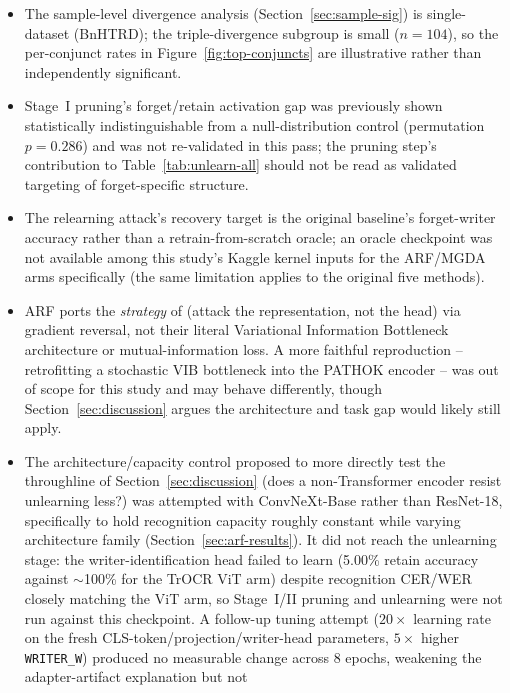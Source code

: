 \documentclass[a4paper,fleqn]{cas-dc}
\begin{document}
\begin{itemize}
\item The sample-level divergence analysis (Section~\ref{sec:sample-sig})
  is single-dataset (BnHTRD); the triple-divergence subgroup is small
  ($n=104$), so the per-conjunct rates in Figure~\ref{fig:top-conjuncts}
  are illustrative rather than independently significant.
\item Stage~I pruning's forget/retain activation gap was previously shown
  statistically indistinguishable from a null-distribution control
  (permutation $p=0.286$) and was not re-validated in this pass; the
  pruning step's contribution to Table~\ref{tab:unlearn-all} should not be
  read as validated targeting of forget-specific structure.
\item The relearning attack's recovery target is the original baseline's
  forget-writer accuracy rather than a retrain-from-scratch oracle; an
  oracle checkpoint was not available among this study's Kaggle kernel
  inputs for the ARF/MGDA arms specifically (the same limitation applies
  to the original five methods).
\item ARF ports the \emph{strategy} of \citet{wang2026rfuss} (attack the
  representation, not the head) via gradient reversal, not their literal
  Variational Information Bottleneck architecture or mutual-information
  loss. A more faithful reproduction -- retrofitting a stochastic VIB
  bottleneck into the PATHOK encoder -- was out of scope for this study and
  may behave differently, though Section~\ref{sec:discussion} argues the
  architecture and task gap would likely still apply.
\item The architecture/capacity control proposed to more directly test the
  throughline of Section~\ref{sec:discussion} (does a non-Transformer
  encoder resist unlearning less?) was attempted with ConvNeXt-Base rather
  than ResNet-18, specifically to hold recognition capacity roughly
  constant while varying architecture family
  (Section~\ref{sec:arf-results}). It did not reach the unlearning stage:
  the writer-identification head failed to learn (5.00\% retain accuracy
  against $\sim$100\% for the TrOCR ViT arm) despite recognition CER/WER
  closely matching the ViT arm, so Stage~I/II pruning and unlearning were
  not run against this checkpoint. A follow-up tuning attempt ($20\times$
  learning rate on the fresh CLS-token/projection/writer-head parameters,
  $5\times$ higher \texttt{WRITER\_W}) produced no measurable change
  across 8 epochs, weakening the adapter-artifact explanation but not

\end{itemize}
\end{document}
